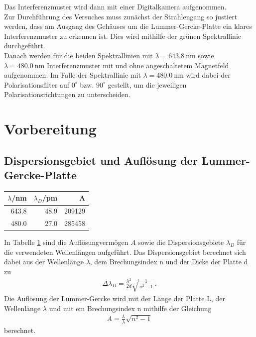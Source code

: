 \documentclass[captions=tableheading]{scrartcl}
\begin{document}
Das Interferenzmuster wird dann mit einer Digitalkamera aufgenommen.\\
Zur Durchführung des Versuches muss zunächst der Strahlengang so justiert werden, dass am Ausgang des Gehäuses um die Lummer-Gercke-Platte ein klares Interferenzmuster zu erkennen ist. Dies wird mithilfe der grünen Spektrallinie durchgeführt. \\
Danach werden für die beiden Spektrallinien mit $\lambda=\SI{643.8}{\nano\metre}$ sowie $\lambda=\SI{480.0}{\nano\metre}$ Interferenzmuster mit und ohne angeschaltetem Magnetfeld aufgenommen. Im Falle der Spektrallinie mit $\lambda=\SI{480.0}{\nano\metre}$ wird dabei der Polarisationsfilter auf $0^{\circ}$ bzw. $90^{\circ}$ gestellt, um die jeweiligen Polarisationsrichtungen zu unterscheiden.

\section{Vorbereitung}

\subsection{Dispersionsgebiet und Auflösung der Lummer-Gercke-Platte}
\begin{table}[H]
	\centering
	\label{tab:lummer}
	\begin{tabular}{r r r}
		\toprule
		$\lambda$/nm & $\lambda_D$/pm & A \\
		\midrule
		643.8 & 48.9 & 209129 \\
		480.0 & 27.0 & 285458 \\
		\bottomrule
	\end{tabular}
\end{table}
In Tabelle \ref{tab:lummer} sind die Auflösungvermögen $A$ sowie die Dispersionsgebiete $\lambda_D$ für die verwendeten Wellenlängen aufgeführt.
Das Dispersionsgebiet berechnet sich dabei aus der Wellenlänge $\lambda$, dem Brechungsindex n und der Dicke der Platte d zu
\begin{align}
\Delta \lambda_D=\frac{\lambda^2}{2d}\sqrt{\frac{1}{n^2-1}}\,.
\end{align}
Die Auflösung der Lummer-Gercke wird mit der Länge der Platte L, der Wellenlänge $\lambda$ und mit em Brechungsindex n mithilfe der Gleichung
\begin{align}
A=\frac{L}{\lambda}\sqrt{n^2-1}
\end{align}
berechnet.
\end{document}
